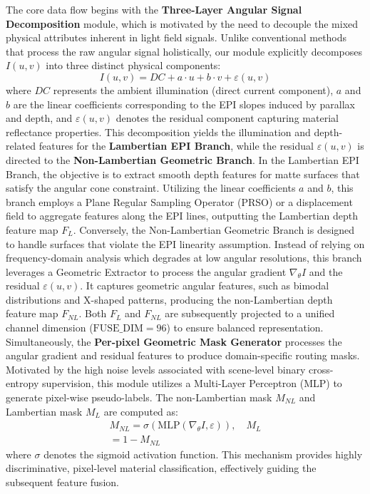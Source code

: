\documentclass[lettersize,journal]{IEEEtran}
\begin{document}
The core data flow begins with the \textbf{Three-Layer Angular Signal Decomposition} module, which is motivated by the need to decouple the mixed physical attributes inherent in light field signals. Unlike conventional methods that process the raw angular signal holistically, our module explicitly decomposes $I(u,v)$ into three distinct physical components:
\begin{equation}
I(u,v) = DC + a \cdot u + b \cdot v + \varepsilon(u,v)
\end{equation}
where $DC$ represents the ambient illumination (direct current component), $a$ and $b$ are the linear coefficients corresponding to the EPI slopes induced by parallax and depth, and $\varepsilon(u,v)$ denotes the residual component capturing material reflectance properties. This decomposition yields the illumination and depth-related features for the \textbf{Lambertian EPI Branch}, while the residual $\varepsilon(u,v)$ is directed to the \textbf{Non-Lambertian Geometric Branch}. In the Lambertian EPI Branch, the objective is to extract smooth depth features for matte surfaces that satisfy the angular cone constraint. Utilizing the linear coefficients $a$ and $b$, this branch employs a Plane Regular Sampling Operator (PRSO) or a displacement field to aggregate features along the EPI lines, outputting the Lambertian depth feature map $F_L$. Conversely, the Non-Lambertian Geometric Branch is designed to handle surfaces that violate the EPI linearity assumption. Instead of relying on frequency-domain analysis which degrades at low angular resolutions, this branch leverages a Geometric Extractor to process the angular gradient $\nabla_{\theta} I$ and the residual $\varepsilon(u,v)$. It captures geometric angular features, such as bimodal distributions and X-shaped patterns, producing the non-Lambertian depth feature map $F_{NL}$. Both $F_L$ and $F_{NL}$ are subsequently projected to a unified channel dimension ($\text{FUSE\_DIM} = 96$) to ensure balanced representation. Simultaneously, the \textbf{Per-pixel Geometric Mask Generator} processes the angular gradient and residual features to produce domain-specific routing masks. Motivated by the high noise levels associated with scene-level binary cross-entropy supervision, this module utilizes a Multi-Layer Perceptron (MLP) to generate pixel-wise pseudo-labels. The non-Lambertian mask $M_{NL}$ and Lambertian mask $M_L$ are computed as:
\begin{multline}

M_{NL} = \sigma(\text{MLP}(\nabla_{\theta} I, \varepsilon)), \quad M_L \\
= 1 - M_{NL}
\end{multline}
where $\sigma$ denotes the sigmoid activation function. This mechanism provides highly discriminative, pixel-level material classification, effectively guiding the subsequent feature fusion.
\end{document}
